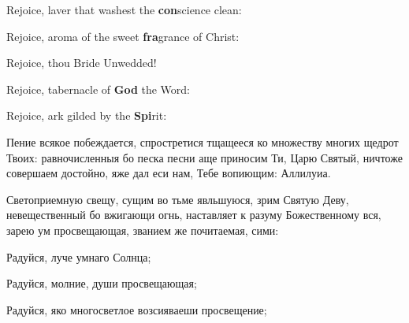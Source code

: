 Rejoice, laver that washest the \textbf{con}science clean:


Rejoice, aroma of the sweet \textbf{fra}grance of Christ:


Rejoice, thou Bride Unwedded!





\PeopleRejoice Rejoice, tabernacle of \textbf{God} the Word:


Rejoice, ark gilded by the \textbf{Spi}rit:


\pagebreak


\Ierei Пение всякое побеждается, спростретися тщащееся ко множеству многих щедрот Твоих: равночисленныя бо песка песни аще приносим Ти, Царю Святый, ничтоже совершаем достойно, яже дал еси нам, Тебе вопиющим: Аллилуиа.


\Ierei Светоприемную свещу, сущим во тьме явльшуюся, зрим Святую Деву, невещественный бо вжигающи огнь, наставляет к разуму Божественному вся, зарею ум просвещающая, званием же почитаемая, сими:

Радуйся, луче умнаго Солнца;


Радуйся, молние, души просвещающая;


Радуйся, яко многосветлое возсияваеши просвещение;


